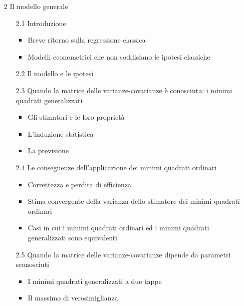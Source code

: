 \documentclass[a4paper,12pt]{article}
\begin{document}
\begin{enumerate}
\item[2] Il modello generale

\begin{enumerate}
\item[2.1] Introduzione

\begin{itemize}
\item Breve ritorno sulla regressione classica

\item Modelli econometrici che non soddisfano le ipotesi classiche
\end{itemize}

\item[2.2] Il modello e le ipotesi

\item[2.3] Quando la matrice delle varianze-covarianze \`{e} conosciuta: i
minimi quadrati generalizzati

\begin{itemize}
\item Gli stimatori e le loro propriet\`{a}

\item L'induzione statistica

\item La previsione
\end{itemize}

\item[2.4] Le conseguenze dell'applicazione dei minimi quadrati ordinari

\begin{itemize}
\item Correttezza e perdita di efficienza

\item Stima convergente della varianza dello stimatore dei minimi quadrati
ordinari

\item Casi in cui i minimi quadrati ordinari ed i minimi quadrati
generalizzati sono equivalenti
\end{itemize}

\item[2.5] Quando la matrice delle varianze-covarianze dipende da parametri
sconosciuti

\begin{itemize}
\item I minimi quadrati generalizzati a due tappe

\item Il massimo di verosimiglianza\newpage
\end{itemize}
\end{enumerate}


\end{enumerate}
\end{document}
